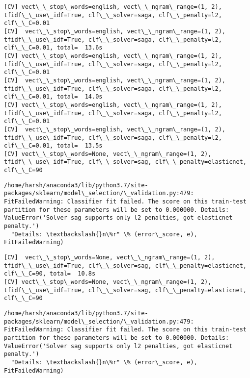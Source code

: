 \documentclass[11pt]{article}
\begin{document}
\begin{Verbatim}[commandchars=\\\{\}]
[CV] vect\_\_stop\_words=english, vect\_\_ngram\_range=(1, 2), tfidf\_\_use\_idf=True, clf\_\_solver=saga, clf\_\_penalty=l2, clf\_\_C=0.01 
[CV]  vect\_\_stop\_words=english, vect\_\_ngram\_range=(1, 2), tfidf\_\_use\_idf=True, clf\_\_solver=saga, clf\_\_penalty=l2, clf\_\_C=0.01, total=  13.6s
[CV] vect\_\_stop\_words=english, vect\_\_ngram\_range=(1, 2), tfidf\_\_use\_idf=True, clf\_\_solver=saga, clf\_\_penalty=l2, clf\_\_C=0.01 
[CV]  vect\_\_stop\_words=english, vect\_\_ngram\_range=(1, 2), tfidf\_\_use\_idf=True, clf\_\_solver=saga, clf\_\_penalty=l2, clf\_\_C=0.01, total=  14.0s
[CV] vect\_\_stop\_words=english, vect\_\_ngram\_range=(1, 2), tfidf\_\_use\_idf=True, clf\_\_solver=saga, clf\_\_penalty=l2, clf\_\_C=0.01 
[CV]  vect\_\_stop\_words=english, vect\_\_ngram\_range=(1, 2), tfidf\_\_use\_idf=True, clf\_\_solver=saga, clf\_\_penalty=l2, clf\_\_C=0.01, total=  13.5s
[CV] vect\_\_stop\_words=None, vect\_\_ngram\_range=(1, 2), tfidf\_\_use\_idf=True, clf\_\_solver=sag, clf\_\_penalty=elasticnet, clf\_\_C=90 

    \end{Verbatim}

    \begin{Verbatim}[commandchars=\\\{\}]
/home/harsh/anaconda3/lib/python3.7/site-packages/sklearn/model\_selection/\_validation.py:479: FitFailedWarning: Classifier fit failed. The score on this train-test partition for these parameters will be set to 0.000000. Details: 
ValueError('Solver sag supports only l2 penalties, got elasticnet penalty.')
  "Details: \textbackslash{}n\%r" \% (error\_score, e), FitFailedWarning)

    \end{Verbatim}

    \begin{Verbatim}[commandchars=\\\{\}]
[CV]  vect\_\_stop\_words=None, vect\_\_ngram\_range=(1, 2), tfidf\_\_use\_idf=True, clf\_\_solver=sag, clf\_\_penalty=elasticnet, clf\_\_C=90, total=  10.8s
[CV] vect\_\_stop\_words=None, vect\_\_ngram\_range=(1, 2), tfidf\_\_use\_idf=True, clf\_\_solver=sag, clf\_\_penalty=elasticnet, clf\_\_C=90 

    \end{Verbatim}

    \begin{Verbatim}[commandchars=\\\{\}]
/home/harsh/anaconda3/lib/python3.7/site-packages/sklearn/model\_selection/\_validation.py:479: FitFailedWarning: Classifier fit failed. The score on this train-test partition for these parameters will be set to 0.000000. Details: 
ValueError('Solver sag supports only l2 penalties, got elasticnet penalty.')
  "Details: \textbackslash{}n\%r" \% (error\_score, e), FitFailedWarning)

    \end{Verbatim}
\end{document}
